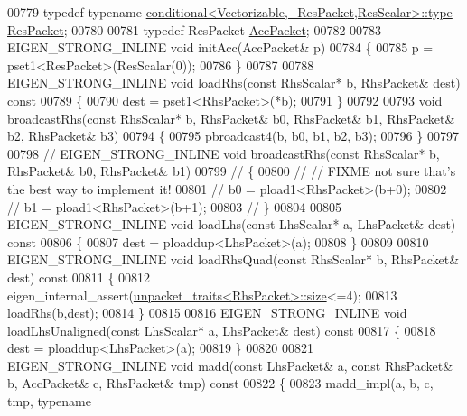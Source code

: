 \begin{DoxyCode}
00779   \textcolor{keyword}{typedef} \textcolor{keyword}{typename} \hyperlink{class_eigen_1_1internal_1_1_tensor_lazy_evaluator_writable}{conditional<Vectorizable,\_ResPacket,ResScalar>::type}
       \hyperlink{class_eigen_1_1internal_1_1_tensor_lazy_evaluator_writable}{ResPacket};
00780 
00781   \textcolor{keyword}{typedef} ResPacket \hyperlink{class_eigen_1_1internal_1_1_tensor_lazy_evaluator_writable}{AccPacket};
00782 
00783   EIGEN\_STRONG\_INLINE \textcolor{keywordtype}{void} initAcc(AccPacket& p)
00784   \{
00785     p = pset1<ResPacket>(ResScalar(0));
00786   \}
00787 
00788   EIGEN\_STRONG\_INLINE \textcolor{keywordtype}{void} loadRhs(\textcolor{keyword}{const} RhsScalar* b, RhsPacket& dest)\textcolor{keyword}{ const}
00789 \textcolor{keyword}{  }\{
00790     dest = pset1<RhsPacket>(*b);
00791   \}
00792   
00793   \textcolor{keywordtype}{void} broadcastRhs(\textcolor{keyword}{const} RhsScalar* b, RhsPacket& b0, RhsPacket& b1, RhsPacket& b2, RhsPacket& b3)
00794   \{
00795     pbroadcast4(b, b0, b1, b2, b3);
00796   \}
00797   
00798 \textcolor{comment}{//   EIGEN\_STRONG\_INLINE void broadcastRhs(const RhsScalar* b, RhsPacket& b0, RhsPacket& b1)}
00799 \textcolor{comment}{//   \{}
00800 \textcolor{comment}{//     // FIXME not sure that's the best way to implement it!}
00801 \textcolor{comment}{//     b0 = pload1<RhsPacket>(b+0);}
00802 \textcolor{comment}{//     b1 = pload1<RhsPacket>(b+1);}
00803 \textcolor{comment}{//   \}}
00804 
00805   EIGEN\_STRONG\_INLINE \textcolor{keywordtype}{void} loadLhs(\textcolor{keyword}{const} LhsScalar* a, LhsPacket& dest)\textcolor{keyword}{ const}
00806 \textcolor{keyword}{  }\{
00807     dest = ploaddup<LhsPacket>(a);
00808   \}
00809   
00810   EIGEN\_STRONG\_INLINE \textcolor{keywordtype}{void} loadRhsQuad(\textcolor{keyword}{const} RhsScalar* b, RhsPacket& dest)\textcolor{keyword}{ const}
00811 \textcolor{keyword}{  }\{
00812     eigen\_internal\_assert(\hyperlink{struct_eigen_1_1internal_1_1unpacket__traits}{unpacket\_traits<RhsPacket>::size}<=4);
00813     loadRhs(b,dest);
00814   \}
00815 
00816   EIGEN\_STRONG\_INLINE \textcolor{keywordtype}{void} loadLhsUnaligned(\textcolor{keyword}{const} LhsScalar* a, LhsPacket& dest)\textcolor{keyword}{ const}
00817 \textcolor{keyword}{  }\{
00818     dest = ploaddup<LhsPacket>(a);
00819   \}
00820 
00821   EIGEN\_STRONG\_INLINE \textcolor{keywordtype}{void} madd(\textcolor{keyword}{const} LhsPacket& a, \textcolor{keyword}{const} RhsPacket& b, AccPacket& c, RhsPacket& tmp)\textcolor{keyword}{ const}
00822 \textcolor{keyword}{  }\{
00823     madd\_impl(a, b, c, tmp, \textcolor{keyword}{typename} 

\end{DoxyCode}
